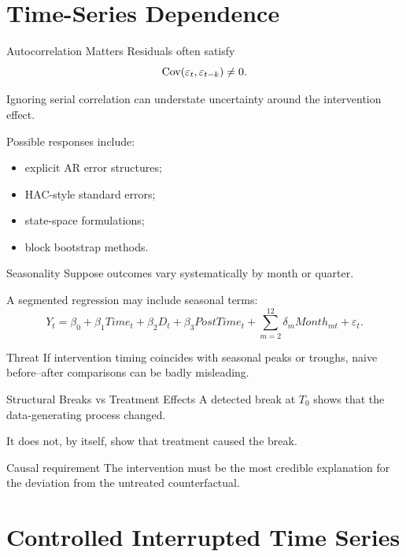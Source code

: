 \documentclass[aspectratio=169,11pt]{beamer}
\begin{document}
\section{Time-Series Dependence}

\begin{frame}{Autocorrelation Matters}
Residuals often satisfy
\[
\operatorname{Cov}(\varepsilon_t,\varepsilon_{t-k})\neq 0.
\]

Ignoring serial correlation can understate uncertainty around the intervention effect.

Possible responses include:
\begin{itemize}
\item explicit AR error structures;
\item HAC-style standard errors;
\item state-space formulations;
\item block bootstrap methods.
\end{itemize}
\end{frame}

\begin{frame}{Seasonality}
Suppose outcomes vary systematically by month or quarter.

A segmented regression may include seasonal terms:
\[
Y_t
=
\beta_0+\beta_1 Time_t+\beta_2 D_t+\beta_3 PostTime_t
+
\sum_{m=2}^{12}\delta_m Month_{mt}
+
\varepsilon_t.
\]

\begin{alertblock}{Threat}
If intervention timing coincides with seasonal peaks or troughs, naive before--after comparisons can be badly misleading.
\end{alertblock}
\end{frame}

\begin{frame}{Structural Breaks vs Treatment Effects}
A detected break at \(T_0\) shows that the data-generating process changed.

It does not, by itself, show that treatment caused the break.

\begin{block}{Causal requirement}
The intervention must be the most credible explanation for the deviation from the untreated counterfactual.
\end{block}
\end{frame}

\section{Controlled Interrupted Time Series}
\end{document}
